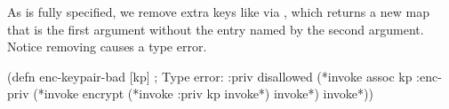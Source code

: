 As  is fully specified, we remove extra keys like 
via , which returns a new map that is the first argument without the
entry named by the second argument. Notice removing  causes a type error.

\begin{cljlisting}
(defn enc-keypair-bad [kp] ; Type error: :priv disallowed
  (*invoke assoc kp :enc-priv (*invoke encrypt (*invoke :priv kp invoke*) invoke*) invoke*))
\end{cljlisting}


%
%


